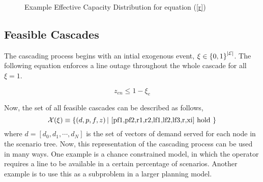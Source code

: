 \begin{figure}
\centering
{}


\caption{ Example Effective Capacity Distribution for equation (\ref{r}) }
\label{cdf}
\end{figure}



\subsection{Feasible Cascades}
The cascading process begins with an intial exogenous event, $\xi \in \left\{ 0, 1 \right\}^{\left| \mathcal{E} \right|}$.  The following equation enforces a line outage throughout the whole cascade for all $\xi = 1$.

\begin{equation}
z_{en} \le 1- \xi_e  \label{xi}
\end{equation}

Now, the set of all feasible cascades can be described as follows, 
\begin{equation}
\cX(\xi) \equiv \left\{ \left(d, p, f, z \right)  |  \mbox{ \cref{pf1,pf2,r1,r2,lf1,lf2,lf3,r,xi}  hold } \right\} 
\end{equation}
where $d = \left[ d_0, d_1, \cdots, d_N \right]$ is the set of vectors of demand served for each node in the scenario tree.  Now, this representation of the cascading process can be used in many ways.  One example is a chance constrained model, in which the operator requires a line to be available in a certain percentage of scenarios.  Another example is to use this as a subproblem in a larger planning model. 

